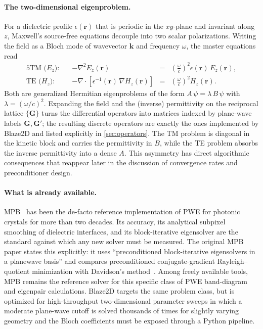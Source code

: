\paragraph{The two-dimensional eigenproblem.}
For a dielectric profile $\epsilon(\bm{r})$ that is periodic in the
$xy$-plane and invariant along $z$, Maxwell's source-free equations
decouple into two scalar polarizations. Writing the field as a Bloch
mode of wavevector $\bm{k}$ and frequency $\omega$, the master
equations read
\begin{alignat}{5}
  \text{TM (}E_z\text{):}\quad & -\nabla^{2} E_{z}(\bm{r})
  &{}={}& \left(\frac{\omega}{c}\right)^{2} \epsilon(\bm{r})\, E_{z}(\bm{r}),
  \label{eq:master_tm}\\
  \text{TE (}H_z\text{):}\quad & -\nabla \cdot \!\left[\epsilon^{-1}(\bm{r})\, \nabla H_{z}(\bm{r})\right]
  &{}={}& \left(\frac{\omega}{c}\right)^{2} H_{z}(\bm{r}).
  \label{eq:master_te}
\end{alignat}
Both are generalized Hermitian eigenproblems of the form
$A\,\psi = \lambda\, B\,\psi$ with $\lambda = (\omega/c)^{2}$. Expanding
the field and the (inverse) permittivity on the reciprocal lattice
$\{\bm{G}\}$ turns the differential operators into matrices indexed by
plane-wave labels $\bm{G}, \bm{G}'$; the resulting discrete operators
are exactly the ones implemented by Blaze2D and listed explicitly in
\cref{sec:operators}. The TM problem is diagonal in the kinetic block
and carries the permittivity in $B$, while the TE problem absorbs the
inverse permittivity into a dense $A$. This asymmetry has direct
algorithmic consequences that reappear later in the discussion of
convergence rates and preconditioner design.

\paragraph{What is already available.}
MPB~\cite{mpb} has been the de-facto reference implementation of PWE
for photonic crystals for more than two decades. Its accuracy, its
analytical subpixel smoothing of dielectric interfaces, and its
block-iterative eigensolver are the standard against which any new
solver must be measured. The original MPB paper states this explicitly:
it uses ``preconditioned block-iterative eigensolvers in a planewave
basis'' and compares preconditioned conjugate-gradient
Rayleigh--quotient minimization with Davidson's method~\cite{mpb}.
Among freely available tools, MPB remains the reference solver for
this specific class of PWE band-diagram and eigenpair calculations.
Blaze2D targets the same problem class, but is optimized for
high-throughput two-dimensional parameter sweeps in which a moderate
plane-wave cutoff is solved thousands of times for slightly varying
geometry and the Bloch coefficients must be exposed through a Python
pipeline.

